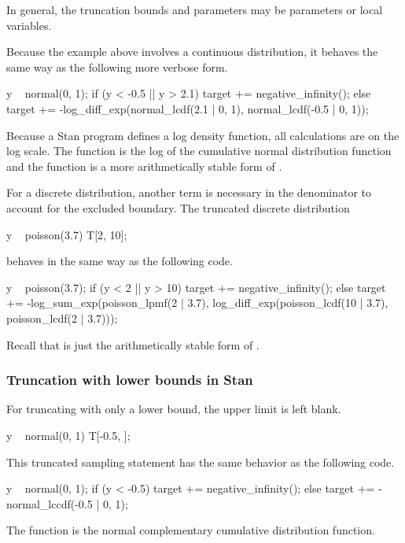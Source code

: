 In general, the truncation bounds and parameters may be parameters or
local variables.

Because the example above involves a continuous distribution, it
behaves the same way as the following more verbose form.
%
\begin{stancode}
y ~ normal(0, 1);
if (y < -0.5 || y > 2.1)
  target += negative_infinity();
else
  target += -log_diff_exp(normal_lcdf(2.1 | 0, 1),
                          normal_lcdf(-0.5 | 0, 1));
\end{stancode}
%
Because a Stan program defines a log density function, all
calculations are on the log scale.  The function 
is the log of the cumulative normal distribution function and the
function  is a more arithmetically stable
form of .

For a discrete distribution, another term is necessary in the
denominator to account for the excluded boundary.  The truncated
discrete distribution
%
\begin{stancode}
y ~ poisson(3.7) T[2, 10];
\end{stancode}
%
behaves in the same way as the following code.
%
\begin{stancode}
y ~ poisson(3.7);
if (y < 2 || y > 10)
  target += negative_infinity();
else
  target += -log_sum_exp(poisson_lpmf(2 | 3.7),
                         log_diff_exp(poisson_lcdf(10 | 3.7),
                                      poisson_lcdf(2 | 3.7)));
\end{stancode}
%
Recall that  is just the arithmetically
stable form of .


\subsubsection{Truncation with lower bounds in Stan}

For truncating with only a lower bound, the upper limit is left blank.
%
\begin{stancode}
y ~ normal(0, 1) T[-0.5, ];
\end{stancode}
%
This truncated sampling statement has the same behavior as the
following code.
%
\begin{stancode}
y ~ normal(0, 1);
if (y < -0.5)
  target += negative_infinity();
else
  target += -normal_lccdf(-0.5 | 0, 1);
\end{stancode}
%
The  function is the normal complementary cumulative
distribution function.

